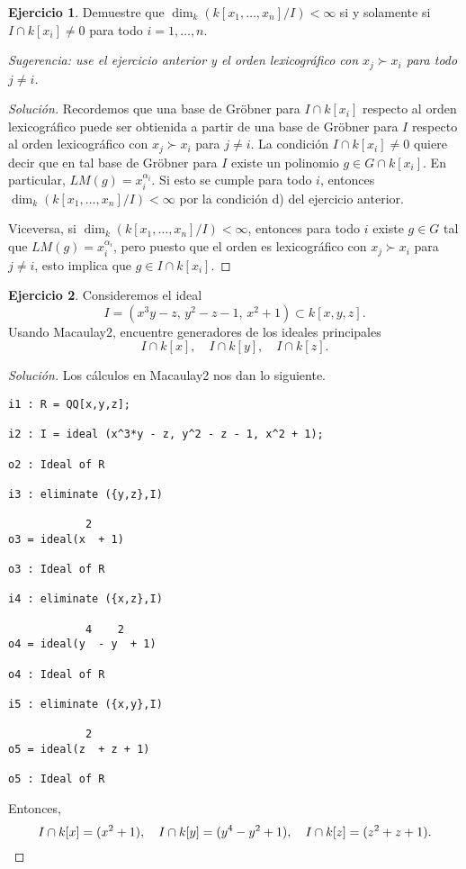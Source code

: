 \documentclass{article}
\theoremstyle{definition}
\newtheorem{ejerc}{Ejercicio}
\newenvironment{solucion}{\begin{proof}[Solución]}{\end{proof}}
\begin{document}
\begin{ejerc}
  Demuestre que $\dim_k (k [x_1,\ldots,x_n]/I) < \infty$ si y solamente si
  $I \cap k [x_i] \ne 0$ para todo $i = 1,\ldots,n$.

  \noindent \emph{Sugerencia: use el ejercicio anterior y el orden lexicográfico
    con $x_j \succ x_i$ para todo $j \ne i$.}

  \ifdefined\solutions\begin{solucion}
    Recordemos que una base de Gröbner para $I \cap k [x_i]$ respecto al orden
    lexicográfico puede ser obtienida a partir de una base de Gröbner para $I$
    respecto al orden lexicográfico con $x_j \succ x_i$ para $j \ne i$. La
    condición $I \cap k[x_i] \ne 0$ quiere decir que en tal base de Gröbner para
    $I$ existe un polinomio $g \in G \cap k [x_i]$. En particular,
    $LM (g) = x_i^{\alpha_i}$. Si esto se cumple para todo $i$, entonces
    $\dim_k (k [x_1,\ldots,x_n]/I) < \infty$ por la condición d) del ejercicio
    anterior.

    Viceversa, si $\dim_k (k [x_1,\ldots,x_n]/I) < \infty$, entonces para todo
    $i$ existe $g \in G$ tal que $LM (g) = x_i^{\alpha_i}$, pero puesto que el
    orden es lexicográfico con $x_j \succ x_i$ para $j \ne i$, esto implica que
    $g \in I \cap k [x_i]$.
  \end{solucion}\fi
\end{ejerc}

\begin{ejerc}
  Consideremos el ideal
  $$I = (x^3 y - z, \, y^2 - z - 1, \, x^2 + 1) \subset k[x,y,z].$$
  Usando Macaulay2, encuentre generadores de los ideales principales
  $$I \cap k[x], \quad I \cap k[y], \quad I \cap k[z].$$

  \ifdefined\solutions\begin{solucion}
    Los cálculos en Macaulay2 nos dan lo siguiente.

    \begin{framed}\small
\begin{verbatim}
i1 : R = QQ[x,y,z];

i2 : I = ideal (x^3*y - z, y^2 - z - 1, x^2 + 1);

o2 : Ideal of R

i3 : eliminate ({y,z},I)

            2
o3 = ideal(x  + 1)

o3 : Ideal of R

i4 : eliminate ({x,z},I)

            4    2
o4 = ideal(y  - y  + 1)

o4 : Ideal of R

i5 : eliminate ({x,y},I)

            2
o5 = ideal(z  + z + 1)

o5 : Ideal of R
\end{verbatim}
    \end{framed}

    Entonces,
    \[ I \cap k [x] =
       (x^2+1), \quad I \cap k [y] =
       (y^4 - y^2 + 1), \quad I \cap k [z] =
       (z^2 + z  + 1). \qedhere \]
  \end{solucion}\fi
\end{ejerc}
\end{document}
